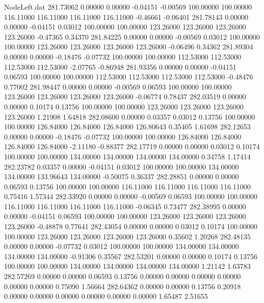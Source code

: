 \begin{filecontents}{NodeLeft.dat}
 281.73062    0.00000    0.00000    -0.04151   -0.00569  100.00000  100.00000  116.11000  116.11000  116.11000  116.11000   -0.46661   -0.06401
 281.78143    0.00000    0.00000    -0.04151    0.03012  100.00000  100.00000  123.26000  123.26000  123.26000  123.26000   -0.47365    0.34370
 281.84225    0.00000    0.00000    -0.00569    0.03012  100.00000  100.00000  123.26000  123.26000  123.26000  123.26000   -0.06496    0.34362
 281.89304    0.00000    0.00000    -0.18476   -0.07732  100.00000  100.00000  112.53000  112.53000  112.53000  112.53000   -2.07765   -0.86948
 281.93356    0.00000    0.00000    -0.04151    0.06593  100.00000  100.00000  112.53000  112.53000  112.53000  112.53000   -0.48476    0.77002
 281.98447    0.00000    0.00000    -0.00569    0.06593  100.00000  100.00000  123.26000  123.26000  123.26000  123.26000   -0.06774    0.78437
 282.03519    0.00000    0.00000     0.10174    0.13756  100.00000  100.00000  123.26000  123.26000  123.26000  123.26000    1.21908    1.64818
 282.08600    0.00000    0.03357     0.03012    0.13756  100.00000  100.00000  126.84000  126.84000  126.84000  126.80643    0.35405    1.61698
 282.12653    0.00000    0.00000    -0.18476   -0.07732  100.00000  100.00000  126.84000  126.84000  126.84000  126.84000   -2.11180   -0.88377
 282.17719    0.00000    0.00000     0.03012    0.10174  100.00000  100.00000  134.00000  134.00000  134.00000  134.00000    0.34758    1.17414
 282.23782    0.03357    0.00000    -0.04151    0.03012  100.00000  100.00000  134.00000  134.00000  133.96643  134.00000   -0.50075    0.36337
 282.28851    0.00000    0.00000     0.06593    0.13756  100.00000  100.00000  116.11000  116.11000  116.11000  116.11000    0.75416    1.57344
 282.33920    0.00000    0.00000    -0.00569    0.06593  100.00000  100.00000  116.11000  116.11000  116.11000  116.11000   -0.06345    0.73477
 282.38995    0.00000    0.00000    -0.04151    0.06593  100.00000  100.00000  123.26000  123.26000  123.26000  123.26000   -0.48878    0.77641
 282.43054    0.00000    0.00000     0.03012    0.10174  100.00000  100.00000  123.26000  123.26000  123.26000  123.26000    0.35602    1.20268
 282.48135    0.00000    0.00000    -0.07732    0.03012  100.00000  100.00000  134.00000  134.00000  134.00000  134.00000   -0.91306    0.35567
 282.53201    0.00000    0.00000     0.10174    0.13756  100.00000  100.00000  134.00000  134.00000  134.00000  134.00000    1.21142    1.63783
 282.57269    0.00000    0.00000     0.06593    0.13756    0.00000    0.00000    0.00000    0.00000    0.00000    0.00000    0.75090    1.56664
 282.64362    0.00000    0.00000     0.13756    0.20918    0.00000    0.00000    0.00000    0.00000    0.00000    0.00000    1.65487    2.51655

\end{filecontents}
